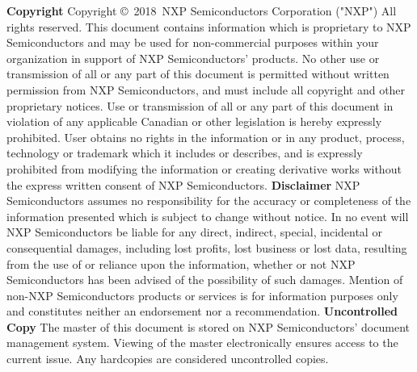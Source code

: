 \documentclass[oneside]{book}
\newcommand{\copyrightYear}{2018}        %
\newcommand{\+}{\discretionary{\mbox{\scriptsize$\hookleftarrow$}}{}{}}
\begin{document}
\footnotesize
{ \setlength{\parindent}{0pt} \textbf{Copyright} }
\newline \newline
\vspace{4pt}
Copyright \copyright \ \copyrightYear \ NXP Semiconductors Corporation ("NXP") All rights reserved.
\newline
\scriptsize
This document contains information which is proprietary to NXP Semiconductors and may be used for non-commercial purposes within your organization in support of NXP Semiconductors' products.
No other use or transmission of all or any part of this document is permitted without written permission from NXP Semiconductors, and must include all copyright and other proprietary notices.
Use or transmission of all or any part of this document in violation of any applicable Canadian or other legislation is hereby expressly prohibited.
\vspace{4pt}
\newline
User obtains no rights in the information or in any product, process, technology or trademark which it includes or describes, and is expressly prohibited from modifying the information or creating derivative works without the express written consent of NXP Semiconductors.
\newline \newline \newline
{\footnotesize \textbf{Disclaimer}}
\vspace{5pt}
\newline
NXP Semiconductors assumes no responsibility for the accuracy or completeness of the information presented which is subject to change without notice.
In no event will NXP Semiconductors be liable for any direct, indirect, special, incidental or consequential damages, including lost profits, lost business or lost data, resulting from the use of or reliance upon the information, whether or not NXP Semiconductors has been advised of the possibility of such damages.
\vspace{3pt}
\newline
Mention of non-NXP Semiconductors products or services is for information purposes only and constitutes neither an endorsement nor a recommendation.
\newline \newline \newline
{\footnotesize \textbf{Uncontrolled Copy}}
\vspace{5pt}
\newline
The master of this document is stored on NXP Semiconductors' document management system.  Viewing of the master electronically ensures access to the current issue. Any hardcopies are considered uncontrolled copies.
\newpage
\normalsize
\end{document}
